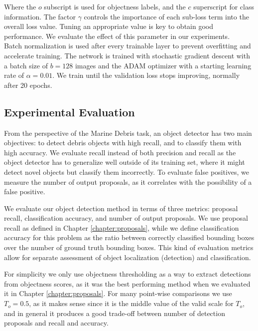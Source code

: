 Where the $o$ subscript is used for objectness labels, and the $c$ superscript for class information. The factor $\gamma$ controls the importance of each sub-loss term into the overall loss value. Tuning an appropriate value is key to obtain good performance. We evaluate the effect of this parameter in our experiments.\\

Batch normalization \cite{ioffe2015batch} is used after every trainable layer to prevent overfitting and accelerate training. The network is trained with stochastic gradient descent with a batch size of $b = 128$ images and the ADAM optimizer \cite[1em]{kingma2014adam} with a starting learning rate of $\alpha = 0.01$. We train until the validation loss stops improving, normally after 20 epochs.

\subsection{Experimental Evaluation}

From the perspective of the Marine Debris task, an object detector has two main objectives: to detect debris objects with high recall, and to classify them with high accuracy. We evaluate recall instead of both precision and recall as the object detector has to generalize well outside of its training set, where it might detect novel objects but classify them incorrectly. To evaluate false positives, we measure the number of output proposals, as it correlates with the possibility of a false positive.

We evaluate our object detection method in terms of three metrics: proposal recall, classification accuracy, and number of output proposals. We use proposal recall as defined in Chapter \ref{chapter:proposals}, while we define classification accuracy for this problem as the ratio between correctly classified bounding boxes over the number of ground truth bounding boxes. This kind of evaluation metrics allow for separate assessment of object localization (detection) and classification.

For simplicity we only use objectness thresholding as a way to extract detections from objectness scores, as it was the best performing method when we evaluated it in Chapter \ref{chapter:proposals}. For many point-wise comparisons we use $T_o = 0.5$, as it makes sense since it is the middle value of the valid scale for $T_o$, and in general it produces a good trade-off between number of detection proposals and recall and accuracy.


